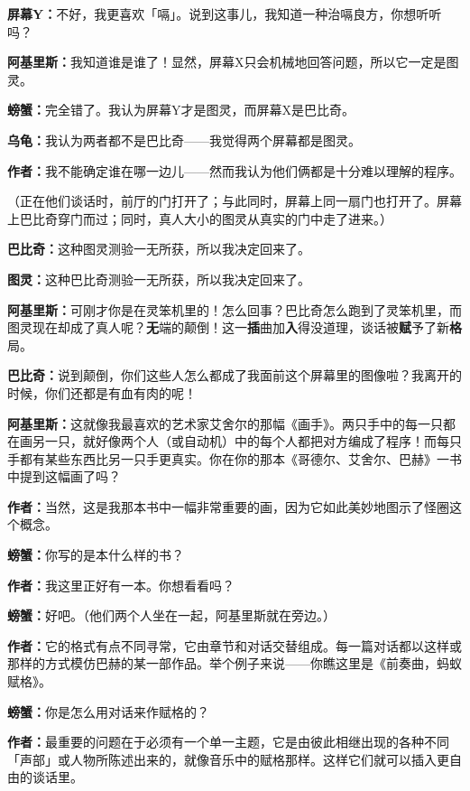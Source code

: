 \documentclass[
  12pt,
  twoside,
  openright,
  oldfontcommands,
]{memoir}
\newcommand{\kaitismall}[1]{{\kaitifamily\small #1}}
\newcommand{\heititext}[1]{{\heifamily\bfseries #1}}
\newcommand{\dialogname}[1]{{\heifamily\bfseries #1}}
\begin{document}
\dialogname{屏幕Y：}不好，我更喜欢「嗝」。说到这事儿，我知道一种治嗝良方，你想听听吗？

\dialogname{阿基里斯：}我知道谁是谁了！显然，屏幕X只会机械地回答问题，所以它一定是图灵。

\dialogname{螃蟹：}完全错了。我认为屏幕Y才是图灵，而屏幕X是巴比奇。

\dialogname{乌龟：}我认为两者都不是巴比奇------我觉得两个屏幕都是图灵。

\dialogname{作者：}我不能确定谁在哪一边儿------然而我认为他们俩都是十分难以理解的程序。

（正在他们谈话时，前厅的门打开了；与此同时，屏幕上同一扇门也打开了。屏幕上巴比奇穿门而过；同时，真人大小的图灵从真实的门中走了进来。）

\dialogname{巴比奇：}这种图灵测验一无所获，所以我决定回来了。

\dialogname{图灵：}这种巴比奇测验一无所获，所以我决定回来了。

\dialogname{阿基里斯：}可刚才你是在灵笨机里的！怎么回事？巴比奇怎么跑到了灵笨机里，而图灵现在却成了真人呢？\heititext{无}端的颠倒！这一\heititext{插}曲加\heititext{入}得没道理，谈话被\heititext{赋}予了新\heititext{格}局。

\dialogname{巴比奇：}说到颠倒，你们这些人怎么都成了我面前这个屏幕里的图像啦？我离开的时候，你们还都是有血有肉的呢！

\dialogname{阿基里斯：}这就像我最喜欢的艺术家艾舍尔的那幅《画手》。两只手中的每一只都在画另一只，就好像两个人（或自动机）中的每个人都把对方编成了程序！而每只手都有某些东西比另一只手更真实。你在你的那本《哥德尔、艾舍尔、巴赫》一书中提到这幅画了吗？

\dialogname{作者：}当然，这是我那本书中一幅非常重要的画，因为它如此美妙地图示了怪圈这个概念。

\dialogname{螃蟹：}你写的是本什么样的书？

\dialogname{作者：}我这里正好有一本。你想看看吗？

\dialogname{螃蟹：}好吧。\kaitismall{（他们两个人坐在一起，阿基里斯就在旁边。）}

\dialogname{作者：}它的格式有点不同寻常，它由章节和对话交替组成。每一篇对话都以这样或那样的方式模仿巴赫的某一部作品。举个例子来说------你瞧这里是《前奏曲，蚂蚁赋格》。

\dialogname{螃蟹：}你是怎么用对话来作赋格的？

\dialogname{作者：}最重要的问题在于必须有一个单一主题，它是由彼此相继出现的各种不同「声部」或人物所陈述出来的，就像音乐中的赋格那样。这样它们就可以插入更自由的谈话里。
\end{document}

